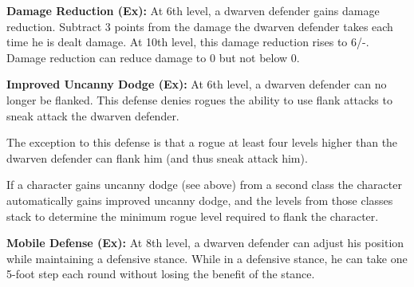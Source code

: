\textbf{Damage Reduction (Ex):} At 6th level, a dwarven defender gains damage reduction. 
Subtract 3 points from the damage the dwarven defender takes each time he is dealt 
damage. At 10th level, this damage reduction rises to 6/-. Damage reduction can 
reduce damage to 0 but not below 0.

\textbf{Improved Uncanny Dodge (Ex):} At 6th level, a dwarven defender can no longer 
be flanked. This defense denies rogues the ability to use flank attacks to sneak 
attack the dwarven defender.

The exception to this defense is that a rogue at least four levels higher than 
the dwarven defender can flank him (and thus sneak attack him).

If a character gains uncanny dodge (see above) from a second class the character 
automatically gains improved uncanny dodge, and the levels from those classes stack 
to determine the minimum rogue level required to flank the character.

\textbf{Mobile Defense (Ex):} At 8th level, a dwarven defender can adjust his position 
while maintaining a defensive stance. While in a defensive stance, he can take 
one 5-foot step each round without losing the benefit of the stance.
